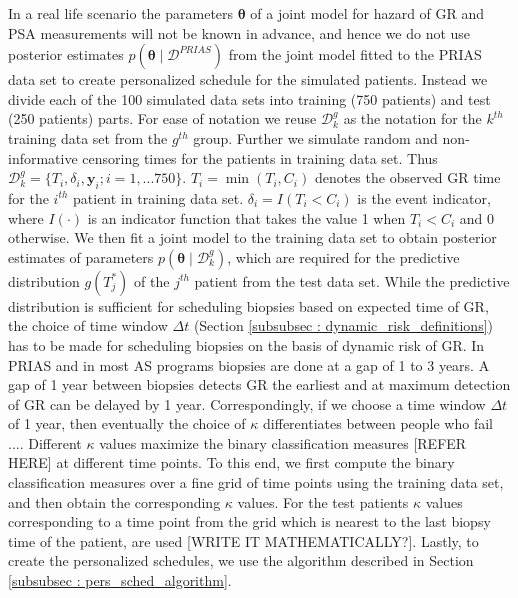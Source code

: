 In a real life scenario the parameters $\boldsymbol{\theta}$ of a joint model for hazard of GR and PSA measurements will not be known in advance, and hence we do not use posterior estimates $p(\boldsymbol{\theta} \mid \mathcal{D}^{PRIAS})$ from the joint model fitted to the PRIAS data set to create personalized schedule for the simulated patients. Instead we divide each of the 100 simulated data sets into training (750 patients) and test (250 patients) parts. For ease of notation we reuse $\mathcal{D}^g_k$ as the notation for the $k^{th}$ training data set from the $g^{th}$ group. Further we simulate random and non-informative censoring times for the patients in training data set. Thus $\mathcal{D}^g_k = \{T_i, \delta_i, \boldsymbol{y}_i; i = 1,...750\}$. $T_i = \min(T_i, C_i)$ denotes the observed GR time for the $i^{th}$ patient in training data set. $\delta_i = I(T_i < C_i)$ is the event indicator, where $I(\cdot)$ is an indicator function that takes the value 1 when $T_i < C_i$ and 0 otherwise. We then fit a joint model to the training data set to obtain posterior estimates of parameters $p(\boldsymbol{\theta} \mid \mathcal{D}^g_k)$, which are required for the predictive distribution $g(T^*_j)$ of the $j^{th}$ patient from the test data set. While the predictive distribution is sufficient for scheduling biopsies based on expected time of GR, the choice of time window $\Delta t$ (Section \ref{subsubsec : dynamic_risk_definitions}) has to be made for scheduling biopsies on the basis of dynamic risk of GR. In PRIAS and in most AS programs biopsies are done at a gap of 1 to 3 years. A gap of 1 year between biopsies detects GR the earliest and at maximum detection of GR can be delayed by 1 year. Correspondingly, if we choose a time window $\Delta t$ of 1 year, then eventually the choice of $\kappa$ differentiates between people who fail .... Different $\kappa$ values maximize the binary classification measures [REFER HERE] at different time points. To this end, we first compute the binary classification measures over a fine grid of time points using the training data set, and then obtain the corresponding $\kappa$ values. For the test patients $\kappa$ values corresponding to a time point from the grid which is nearest to the last biopsy time of the patient, are used [WRITE IT MATHEMATICALLY?]. Lastly, to create the personalized schedules, we use the algorithm described in Section \ref{subsubsec : pers_sched_algorithm}.

